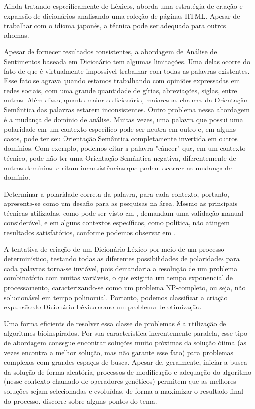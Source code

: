 \documentclass[a4paper,11pt]{article}
\begin{document}
Ainda tratando especificamente de Léxicos, \cite{kaji} aborda uma estratégia de criação e expansão de dicionários analisando uma coleção de páginas HTML. Apesar de trabalhar com o idioma japonês, a técnica pode ser adequada para outros idiomas.

Apesar de fornecer resultados consistentes, a abordagem de Análise de Sentimentos baseada em Dicionário tem algumas limitações. Uma delas ocorre do fato de que é virtualmente impossível trabalhar com todas as palavras existentes. Esse fato se agrava quando estamos trabalhando com opiniões expressadas em redes sociais, com uma grande quantidade de gírias, abreviações, siglas, entre outros. Além disso, quanto maior o dicionário, maiores as chances da Orientação Semântica das palavras estarem inconsistentes. Outro problema nessa abordagem é a mudança de domínio de análise. Muitas vezes, uma palavra que possui uma polaridade em um contexto específico pode ser neutra em outro e, em alguns casos, pode ter seu Orientação Semântica completamente invertida em outros domínios. Com exemplo, podemos citar a palavra "câncer" que, em um contexto técnico, pode não ter uma Orientação Semântica negativa, diferentemente de outros domínios. \cite{kdir16} e \cite{Abbasi} citam inconsistências que podem ocorrer na mudança de domínio.

Determinar a polaridade correta da palavra, para cada contexto, portanto, apresenta-se como um desafio para as pesquisas na área. Mesmo as principais técnicas utilizadas, como pode ser visto em \cite{taboada2011lexicon}, demandam uma validação manual considerável, e em alguns contextos específicos, como política, não atingem resultados satisfatórios, conforme podemos observar em \cite{kdir16}.

A tentativa de criação de um Dicionário Léxico por meio de um processo determinístico, testando todas as diferentes possibilidades de polaridades para cada palavras torna-se inviável, pois demandaria a resolução de um problema combinatório com muitas variáveis, o que exigiria um tempo exponencial de processamento, caracterizando-se como um problema NP-completo, ou seja, não solucionável em tempo polinomial. Portanto, podemos classificar a criação expansão do Dicionário Léxico como um problema de otimização.

Uma forma eficiente de resolver essa classe de problemas é a utilização de algoritmos bioinspirados. Por sua característica inerentemente paralela, esse tipo de abordagem consegue encontrar soluções muito próximas da solução ótima (as vezes encontra a melhor solução, mas não garante esse fato) para problemas complexos com grandes espaços de busca. Apesar de, geralmente, iniciar a busca da solução de forma aleatória, processos de modificação e adequação do algoritmo (nesse contexto chamado de operadores genéticos) permitem que as melhores soluções sejam selecionadas e evoluídas, de forma a maximizar o resultado final do processo. \cite{Abbasi} discorre sobre alguns pontos do tema.
\end{document}
